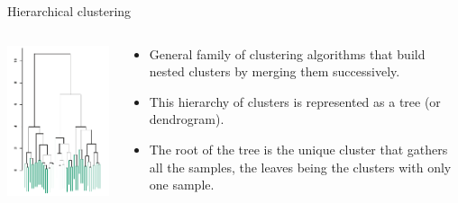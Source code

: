 \documentclass{beamer}
\begin{document}

\begin{frame}{Hierarchical clustering}

\begin{columns}[T]

\begin{column}{0.33\textwidth}
\includegraphics[scale=0.75]{./figures/hierarchy.png}
\end{column}
\begin{column}{0.66\textwidth}
\begin{itemize}
\item General family of clustering algorithms that {\color{blue}build nested clusters by merging them successively}.\\[2em]

\item This hierarchy of clusters is represented as a tree (or dendrogram).\\[2em]

\item The root of the tree is the unique cluster that gathers all the samples, the leaves being the clusters with only one sample.
\end{itemize}
\end{column}

\end{columns}

\end{frame}


\end{document}
